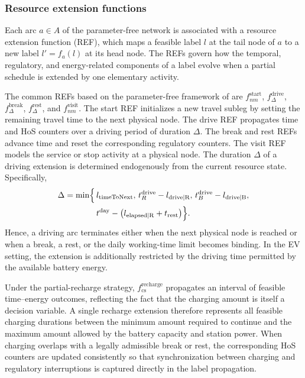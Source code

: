\documentclass[3p,11pt,authoryear]{elsarticle}  %
\begin{document}

\subsubsection{Resource extension functions}


Each arc \(a\in A\) of the parameter-free network is associated with a resource extension function (REF), which maps a feasible label \(l\) at the tail node of \(a\) to a new label \(l'=f_a(l)\) at its head node. The REFs govern how the temporal, regulatory, and energy-related components of a label evolve when a partial schedule is extended by one elementary activity. 

The common REFs based on the parameter-free framework of \citet{goel2017exact} are \(f^{\text{start}}_{nm}\), \(f^{\text{drive}}_{\Delta}\), \(f^{\text{break}}_{\Delta}\), \(f^{\text{rest}}_{\Delta}\), and \(f^{\text{visit}}_{nm}\). The start REF initializes a new travel subleg by setting the remaining travel time to the next physical node. The drive REF propagates time and HoS counters over a driving period of duration \(\Delta\). The break and rest REFs advance time and reset the corresponding regulatory counters. The visit REF models the service or stop activity at a physical node. The duration \(\Delta\) of a driving extension is determined endogenously from the current resource state. Specifically,
\[
\begin{aligned}
\Delta = \min\Bigl\{\, &
l_{\text{timeToNext}},\,
t_{R}^{\text{drive}} - l_{\text{drive|R}},\,
t_{B}^{\text{drive}} - l_{\text{drive|B}},\\
&
t^{\text{day}} - \bigl(l_{\text{elapsed|R}} + t_{\text{rest}}\bigr)
\Bigr\}.
\end{aligned}
\]
Hence, a driving arc terminates either when the next physical node is reached or when a break, a rest, or the daily working-time limit becomes binding. In the EV setting, the extension is additionally restricted by the driving time permitted by the available battery energy.

Under the partial-recharge strategy, \(f^{\text{recharge}}_{\mathrm{cs}}\) propagates an interval of feasible time--energy outcomes, reflecting the fact that the charging amount is itself a decision variable. A single recharge extension therefore represents all feasible charging durations between the minimum amount required to continue and the maximum amount allowed by the battery capacity and station power. When charging overlaps with a legally admissible break or rest, the corresponding HoS counters are updated consistently so that synchronization between charging and regulatory interruptions is captured directly in the label propagation.
\end{document}
